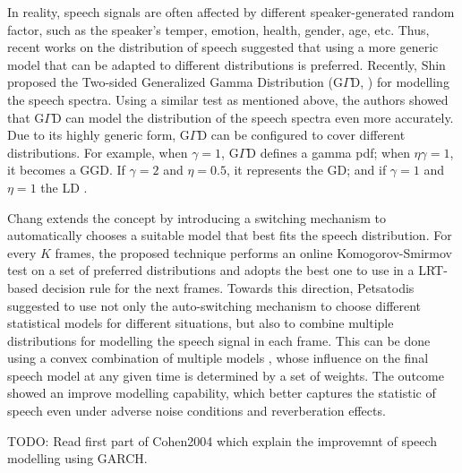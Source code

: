 In reality, speech signals are often affected by different speaker-generated random factor, such as the speaker's temper, emotion, health, gender, age, etc. Thus, recent works on the distribution of speech \cite{shin2005statistical,shin2010voice,petsatodis2011convex} suggested that using a more generic model that can be adapted to different distributions is preferred. Recently, Shin \etal \cite{shin2005statistical} proposed the Two-sided Generalized Gamma Distribution (G$\Gamma$D, ) for modelling the speech spectra. Using a similar test as mentioned above, the authors showed that G$\Gamma$D can model the distribution of the speech spectra even more accurately. Due to its highly generic form, G$\Gamma$D can be configured to cover different distributions. For example, when $\gamma=1$, G$\Gamma$D defines a gamma pdf; when $\eta\gamma=1$, it becomes a GGD. If $\gamma=2$ and $\eta=0.5$, it represents the GD; and if $\gamma=1$ and $\eta=1$ the LD \cite{shin2005statistical}.

Chang \etal \cite{chang2006voice} extends the concept by introducing a switching mechanism to automatically chooses a suitable model that best fits the speech distribution. For every $K$ frames, the proposed technique performs an online Komogorov-Smirmov test on a set of preferred distributions and adopts the best one to use in a LRT-based decision rule for the next frames.
Towards this direction, Petsatodis \etal \cite{petsatodis2011convex} suggested to use not only the auto-switching mechanism to choose different statistical models for different situations, but also to combine multiple distributions for modelling the speech signal in each frame. This can be done using a convex combination of multiple models \cite{petsatodis2011convex}, whose influence on the final speech model at any given time is determined by a set of weights. The outcome showed an improve modelling capability, which better captures the statistic of speech even under adverse noise conditions and reverberation effects. %



TODO: Read first part of Cohen2004 which explain the improvemnt of speech modelling using GARCH.


